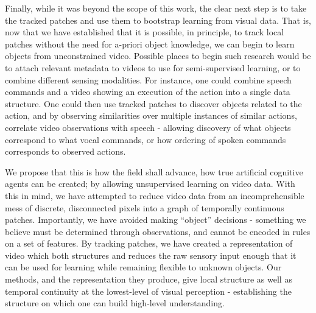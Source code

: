 Finally, while it was beyond the scope of this work, the clear next step is to take the tracked patches and use them to bootstrap learning from visual data. That is, now that we have established that it is possible, in principle, to track local patches without the need for a-priori object knowledge, we can begin to learn objects from unconstrained video. Possible places to begin such research would be to attach relevant metadata to videos to use for semi-supervised learning, or to combine different sensing modalities. For instance, one could combine speech commands and a video showing an execution of the action into a single data structure. One could then use tracked patches to discover objects related to the action, and by observing similarities over multiple instances of similar actions, correlate video observations with speech - allowing discovery of what objects correspond to what vocal commands, or how ordering of spoken commands corresponds to observed actions. 

We propose that this is how the field shall advance, how true artificial cognitive agents can be created; by allowing unsupervised learning on video data. With this in mind, we have attempted to reduce video data from an incomprehensible mess of discrete, disconnected pixels into a graph of temporally continuous patches. Importantly, we have avoided making ``object'' decisions - something we believe must be determined through observations, and cannot be encoded in rules on a set of features. By tracking patches, we have created a representation of video which both structures and reduces the raw sensory input enough that it can be used for learning while remaining flexible to unknown objects. Our methods, and the representation they produce, give local structure as well as temporal continuity at the lowest-level of visual perception - establishing the structure on which one can build high-level understanding. 







